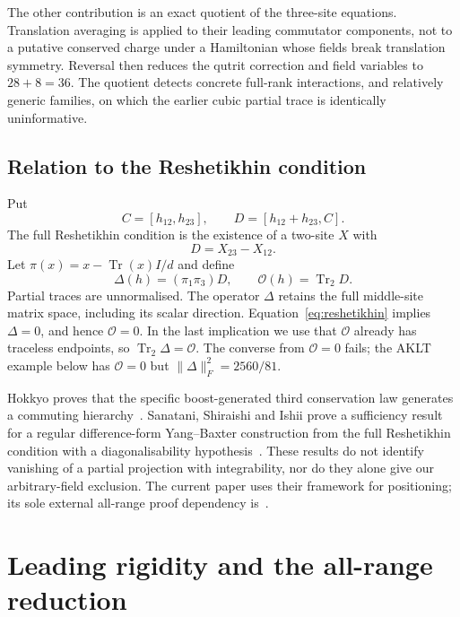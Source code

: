 \documentclass[11pt,a4paper]{article}
\numberwithin{equation}{section}
\theoremstyle{definition}\newtheorem{definition}[theorem]{Definition}
\theoremstyle{remark}\newtheorem{remark}[theorem]{Remark}
\DeclareMathOperator{\Tr}{Tr}\DeclareMathOperator{\rank}{rank}
\newcommand{\Ob}{\mathcal O}\newcommand{\tens}{\otimes}
\begin{document}
The other contribution is an exact quotient of the three-site equations. Translation averaging is applied to their leading commutator components, not to a putative conserved charge under a Hamiltonian whose fields break translation symmetry. Reversal then reduces the qutrit correction and field variables to $28+8=36$. The quotient detects concrete full-rank interactions, and relatively generic families, on which the earlier cubic partial trace is identically uninformative.

\subsection{Relation to the Reshetikhin condition}\label{sec:reshetikhin}
Put
\begin{equation}\label{eq:CD}
 C=[h_{12},h_{23}],\qquad D=[h_{12}+h_{23},C].
\end{equation}
The full Reshetikhin condition is the existence of a two-site $X$ with
\begin{equation}\label{eq:reshetikhin}
 D=X_{23}-X_{12}.
\end{equation}
Let $\pi(x)=x-\Tr(x)I/d$ and define
\begin{equation}\label{eq:delta}
 \Delta(h)=(\pi_1\pi_3)D,\qquad \Ob(h)=\Tr_2D.
\end{equation}
Partial traces are unnormalised. The operator $\Delta$ retains the full middle-site matrix space, including its scalar direction. Equation~\eqref{eq:reshetikhin} implies $\Delta=0$, and hence $\Ob=0$. In the last implication we use that $\Ob$ already has traceless endpoints, so $\Tr_2\Delta=\Ob$. The converse from $\Ob=0$ fails; the AKLT example below has $\Ob=0$ but $\|\Delta\|_F^2=2560/81$.

Hokkyo proves that the specific boost-generated third conservation law generates a commuting hierarchy~\cite{HokkyoLaw}. Sanatani, Shiraishi and Ishii prove a sufficiency result for a regular difference-form Yang--Baxter construction from the full Reshetikhin condition with a diagonalisability hypothesis~\cite{SSI}. These results do not identify vanishing of a partial projection with integrability, nor do they alone give our arbitrary-field exclusion. The current paper uses their framework for positioning; its sole external all-range proof dependency is~\cite{HokkyoTest}.

\section{Leading rigidity and the all-range reduction}\label{sec:rigidity}
\end{document}
